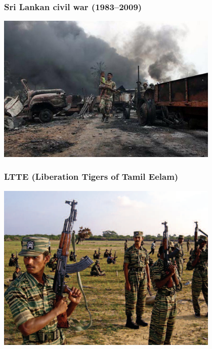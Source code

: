 \documentclass[aspectratio=43]{beamer}
\begin{document}
\begin{frame}
\frametitle{Sri Lankan civil war (1983--2009)}
\centering

\includegraphics[width = 0.8\textwidth]{img/sri_lanka_war}

\end{frame}

\begin{frame}
\frametitle{LTTE (Liberation Tigers of Tamil Eelam)}
\centering

\includegraphics[width = 0.8\textwidth]{img/ltte}

\end{frame}
\end{document}
